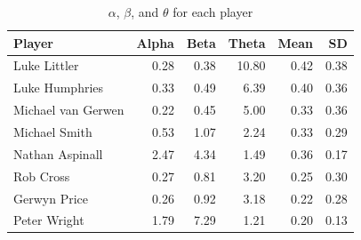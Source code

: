 \documentclass[
]{article}
\begin{document}
\scriptsize

{

\begin{longtable}[]{@{}lrrrrr@{}}

\caption{\label{tbl-beta}\(\alpha\), \(\beta\), and \(\theta\) for each
player}

\tabularnewline

\toprule\noalign{}
Player & Alpha & Beta & Theta & Mean & SD \\
\midrule\noalign{}
\endhead
\bottomrule\noalign{}
\endlastfoot
Luke Littler & 0.28 & 0.38 & 10.80 & 0.42 & 0.38 \\
Luke Humphries & 0.33 & 0.49 & 6.39 & 0.40 & 0.36 \\
Michael van Gerwen & 0.22 & 0.45 & 5.00 & 0.33 & 0.36 \\
Michael Smith & 0.53 & 1.07 & 2.24 & 0.33 & 0.29 \\
Nathan Aspinall & 2.47 & 4.34 & 1.49 & 0.36 & 0.17 \\
Rob Cross & 0.27 & 0.81 & 3.20 & 0.25 & 0.30 \\
Gerwyn Price & 0.26 & 0.92 & 3.18 & 0.22 & 0.28 \\
Peter Wright & 1.79 & 7.29 & 1.21 & 0.20 & 0.13 \\

\end{longtable}

}

\normalsize

\normalsize
\end{document}
